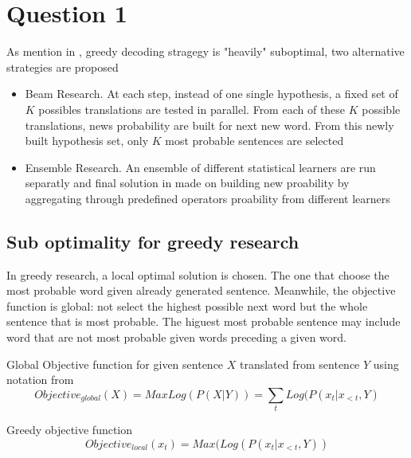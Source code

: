 \documentclass[a4paper]{article}
\begin{document}



\section{Question 1}
As mention in \cite{luong2016}, greedy decoding stragegy is "heavily" suboptimal, two alternative strategies are proposed
\begin{itemize}
\item Beam Research. At each step, instead of one single hypothesis, a fixed set of $K$ possibles translations are tested in parallel. From each of these $K$ possible translations, news probability are built for next new word. From this newly built hypothesis set, only $K$ most probable sentences are selected
\item Ensemble Research. An ensemble of different statistical learners are run separatly and final solution in made on building new proability by aggregating through predefined operators proability  from different learners
\end{itemize}

\subsection{Sub optimality for greedy research}

In greedy research, a local optimal solution is chosen. The one that choose the most probable word given already generated sentence. Meanwhile, the objective function is global: not select the highest possible next word but the whole sentence that is most probable. The higuest most probable  sentence may include word that are not most probable given words preceding a given word.

Global Objective function for given sentence $X$ translated from sentence $Y$ using notation from \citep{luong2016}
\begin{equation}
Objective_{global}(X) = Max Log (P( X \vert Y)) = \sum_{t} Log( P( x_{t} \vert x_{<t},Y)  
\end{equation}


Greedy objective function
\begin{equation}
Objective_{local}(x_{t}) = Max ( Log( P( x_{t} \vert x_{<t},Y))
\end{equation}
\end{document}

